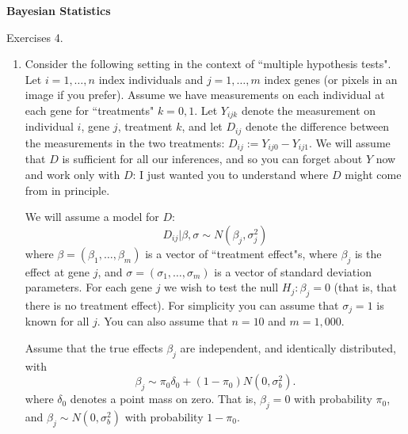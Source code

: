 \documentclass[12pt]{article}
\begin{document}
\begin{center}
{\bf
Bayesian Statistics

\smallskip

Exercises 4.
}
\smallskip

\end{center}

\bigskip

\begin{enumerate}
\item Consider the following setting in the context of ``multiple hypothesis tests".
Let $i=1,\dots,n$ index individuals and $j=1,\dots,m$ index genes (or pixels in an image if you prefer). Assume we have
measurements on each individual at each gene for ``treatments" $k=0,1$. Let $Y_{ijk}$ denote the
measurement on individual $i$, gene $j$, treatment $k$, and let $D_{ij}$ denote the difference between the measurements
in the two treatments: $D_{ij}:= Y_{ij0}-Y_{ij1}$. We will assume that $D$ is sufficient for all our inferences, and so you can forget about $Y$ now and work
only with $D$: I just wanted you to understand where $D$ might come from in principle.

We will assume a model for $D$:
\begin{equation} \label{eqn:D}
D_{ij} | \beta, \sigma \sim N(\beta_j, \sigma_j^2)
\end{equation}
where $\beta=(\beta_1,\dots,\beta_m)$ is a vector of ``treatment effect"s, where
$\beta_j$ is the effect at gene $j$, and $\sigma=(\sigma_1,\dots,\sigma_m)$ is a vector of 
standard deviation parameters. 
For each gene $j$ we wish to test
the null $H_j: \beta_j=0$ (that is, that there is no treatment effect). For simplicity you can assume that $\sigma_j=1$ is known for all $j$. You can also assume that $n=10$ and $m=1,000$.

Assume that the true effects
$\beta_j$ are independent, and identically distributed, with 
\begin{equation} \label{eqn:B}
\beta_j \sim \pi_0 \delta_0 + (1-\pi_0) N(0,\sigma^2_b).
\end{equation}
where $\delta_0$ denotes a point mass on zero.
That is, $\beta_j=0$ with probability $\pi_0$, and $\beta_j\sim  N(0,\sigma^2_b)$ with probability $1-\pi_0$.


\end{enumerate}
\end{document}
